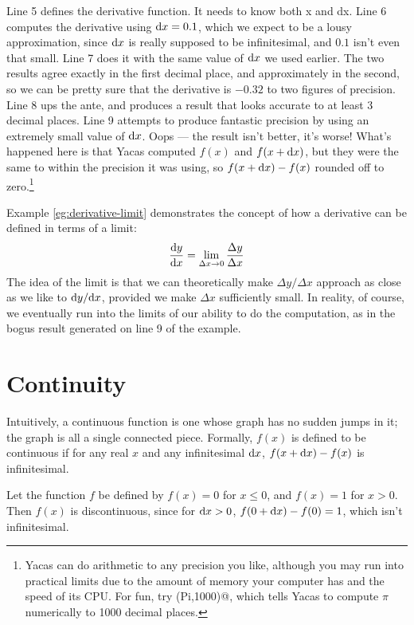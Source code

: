 Line 5 defines the derivative function. It needs to know both x and dx. Line
6 computes the derivative using $\textup{d} x=0.1$, which we expect to be a lousy approximation,
since $\textup{d} x$ is really supposed to be infinitesimal, and $0.1$ isn't even that small.
Line 7 does it with the same value of $\textup{d} x$ we used earlier. The two results agree
exactly in the first decimal place, and approximately in the second, so we can be
pretty sure that the derivative is $-0.32$ to two figures of precision. Line 8
ups the ante, and produces a result that looks accurate to at least 3 decimal places.
Line 9 attempts to produce fantastic precision by using an extremely small value of $\textup{d} x$.
Oops --- the result isn't better, it's worse! What's happened here is that Yacas
computed $f(x)$ and $f(x+\textup{d} x)$, but they were the same to within the precision it
was using, so $f(x+\textup{d} x)-f(x)$ rounded off to zero.\footnote{Yacas can do arithmetic
to any precision you like, although you may run into practical limits due to the amount
of memory your computer has and the speed of its CPU. For fun, try \verb@N(Pi,1000)@,
which tells Yacas to compute $\pi$ numerically to 1000 decimal places.}

Example \ref{eg:derivative-limit} demonstrates the concept of how a derivative can be
defined in terms of a limit:
\begin{equation*}
  \frac{\textup{d} y}{\textup{d} x} = \lim_{\Delta x\rightarrow 0} \frac{\Delta y}{\Delta x}
\end{equation*}
The idea of the limit is that we can theoretically make $\Delta y/\Delta x$ approach
as close as we like to $\textup{d} y/\textup{d} x$, provided we make $\Delta x$ sufficiently small.
In reality, of course, we eventually run into the limits of our ability to do the
computation, as in the bogus result generated on line 9 of the example.

\section{Continuity}

Intuitively, a continuous function is one whose graph
has no sudden jumps in it; the graph is all a single connected piece. Formally, $f(x)$ is defined to
be continuous if for any real $x$ and any infinitesimal $\textup{d} x$, $f(x+\textup{d} x)-f(x)$ is infinitesimal.

\begin{eg}
Let the function $f$ be defined by $f(x)=0$ for $x\le 0$, and $f(x)=1$ for $x>0$. Then $f(x)$ is
discontinuous, since for $\textup{d} x>0$, $f(0+\textup{d} x)-f(0)=1$, which isn't infinitesimal.
\end{eg}

